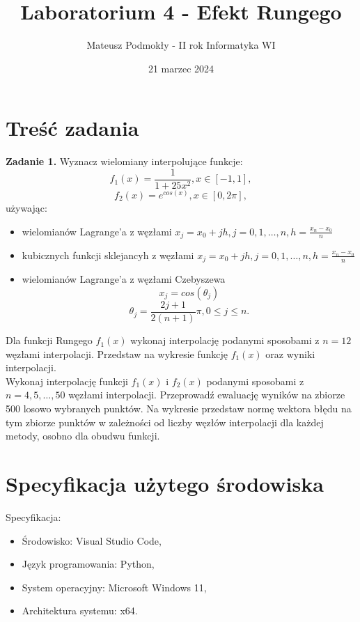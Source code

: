 \documentclass[11pt]{scrartcl}
\title{Laboratorium 4 - Efekt Rungego}
\author{Mateusz Podmokły - II rok Informatyka WI}
\date{21 marzec 2024}
\begin{document}
    \maketitle

    \section{Treść zadania}
    \textbf{Zadanie 1.} Wyznacz wielomiany interpolujące funkcje:
    \[
        f_1(x)=\frac{1}{1+25x^2}, x \in [-1,1],
    \]
    \[
        f_2(x)=e^{cos(x)}, x \in [0,2\pi],
    \]
    używając:
    \begin{itemize}[label=--]
        \item wielomianów Lagrange'a z węzłami $x_j=x_0+jh, j=0,1,
            \ldots ,n, h=\frac{x_n-x_0}{n}$
        \item kubicznych funkcji sklejancyh z węzłami $x_j=x_0+jh,
            j=0,1, \ldots ,n, h=\frac{x_n-x_0}{n}$
        \item wielomianów Lagrange'a z węzłami Czebyszewa
        \[
            x_j=cos(\theta_j)
        \]
        \[
            \theta_j=\frac{2j+1}{2(n+1)}\pi, 0 \leq j \leq n.
        \]
    \end{itemize}
    Dla funkcji Rungego $f_1(x)$ wykonaj interpolację podanymi
    sposobami z $n=12$ węzłami interpolacji. Przedstaw na wykresie
    funkcję $f_1(x)$ oraz wyniki interpolacji. \\
    Wykonaj interpolację funkcji $f_1(x)$ i $f_2(x)$ podanymi
    sposobami z $n=4,5, \ldots ,50$ węzłami interpolacji. Przeprowadź
    ewaluację wyników na zbiorze 500 losowo wybranych punktów.
    Na wykresie przedstaw normę wektora błędu na tym zbiorze
    punktów w zależności od liczby węzłów interpolacji dla każdej
    metody, osobno dla obudwu funkcji.

    \section{Specyfikacja użytego środowiska}
    Specyfikacja:

    \begin{itemize}
        \item Środowisko: Visual Studio Code,
        \item Język programowania: Python,
        \item System operacyjny: Microsoft Windows 11,
        \item Architektura systemu: x64.
    \end{itemize}
\end{document}
